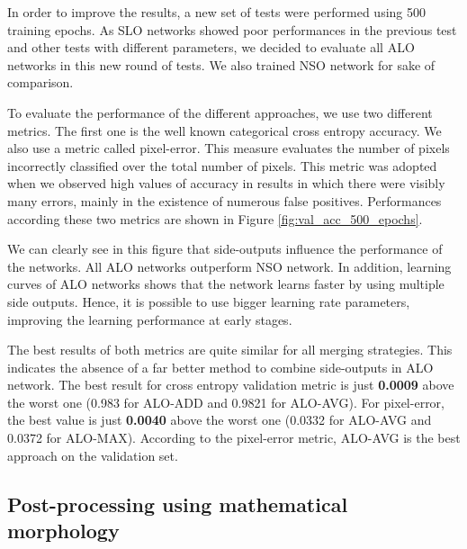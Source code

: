 In order to improve the results, a new set of tests were performed using 500 training epochs. As SLO networks showed poor performances in the previous test and other tests with different parameters, we decided to evaluate all ALO networks in this new round of tests. We also trained NSO network for sake of comparison.



To evaluate the performance of the different approaches, we use two different metrics. The first one is the well known categorical cross entropy accuracy.
We also use a metric called pixel-error. This measure evaluates the number of pixels incorrectly classified over the total number of pixels. This metric was adopted when we observed high values of accuracy in results in which there were visibly many errors, mainly in the existence of numerous false positives. Performances according these two metrics are shown in Figure \ref{fig:val_acc_500_epochs}.



We can clearly see in this figure that side-outputs influence the performance of the networks. All ALO networks outperform NSO network. In addition, learning curves of ALO networks shows that the network learns faster by using multiple side outputs. Hence, it is possible to use bigger learning rate parameters, improving the learning performance at early stages.

The best results of both metrics are quite similar for all merging strategies. This indicates the absence of a far better method to combine side-outputs in ALO network. The best result for cross entropy validation metric is just \textbf{0.0009} above the worst one (0.983 for ALO-ADD and 0.9821 for ALO-AVG). For pixel-error, the best value is just \textbf{0.0040} above the worst one (0.0332 for ALO-AVG and 0.0372 for ALO-MAX). According to the pixel-error metric, ALO-AVG is the best approach on the validation set.


\subsection{Post-processing using mathematical morphology}

